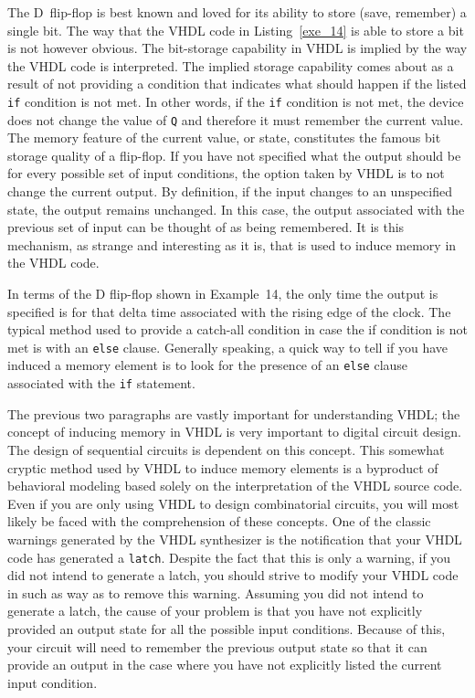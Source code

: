 The D~flip-flop is best known and loved for its ability to store (save, remember) a single bit. The way that the VHDL code in Listing~\ref{exe_14} is able to store a bit is not however obvious. The bit-storage capability in VHDL is implied by the way the VHDL code is interpreted. The implied storage capability comes about as a result of not providing a condition that indicates what should happen if the listed \texttt{if} condition is not met. In other words, if the \texttt{if} condition is not met, the device does not change the value of \texttt{Q} and therefore it must remember the current value. The memory feature of the current value, or state, constitutes the famous bit storage quality of a flip-flop. If you have not specified what the output should be for every possible set of input conditions, the option taken by VHDL is to not change the current output. By definition, if the input changes to an unspecified state, the output remains unchanged. In this case, the output associated with the previous set of input can be thought of as being remembered. It is this mechanism, as strange and interesting as it is, that is used to induce memory in the VHDL code. 

In terms of the D flip-flop shown in Example~14, the only time the output is specified is for that delta time associated with the rising edge of the clock. The typical method used to provide a catch-all condition in case the if condition is not met is with an \texttt{else} clause. Generally speaking, a quick way to tell if you have induced a memory element is to look for the presence of an \texttt{else} clause associated with the \texttt{if} statement. 

The previous two paragraphs are vastly important for understanding VHDL; the concept of inducing memory in VHDL is very important to digital circuit design. The design of sequential circuits is dependent on this concept. This somewhat cryptic method used by VHDL to induce memory elements is a byproduct of behavioral modeling based solely on the interpretation of the VHDL source code. Even if you are only using VHDL to design combinatorial circuits, you will most likely be faced with the comprehension of these concepts. One of the classic warnings generated by the VHDL synthesizer is the notification that your VHDL code has generated a \texttt{latch}. Despite the fact that this is only a warning, if you did not intend to generate a latch, you should strive to modify your VHDL code in such as way as to remove this warning. Assuming you did not intend to generate a latch, the cause of your problem is that you have not explicitly provided an output state for all the possible input conditions. Because of this, your circuit will need to remember the previous output state so that it can provide an output in the case where you have not explicitly listed the current input condition. 

